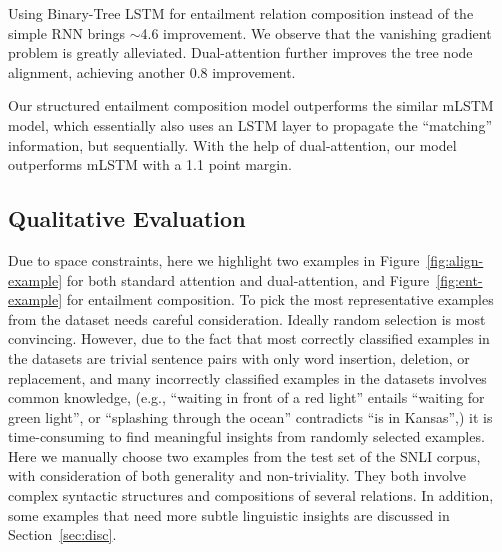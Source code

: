 Using Binary-Tree LSTM for entailment relation composition
instead of the simple RNN brings $\sim$4.6 improvement. 
We observe that the vanishing gradient problem is greatly
alleviated.
Dual-attention further improves the tree
node alignment, achieving another 0.8 improvement.

Our structured entailment composition model outperforms
the similar mLSTM model, which essentially
also uses an LSTM layer to propagate 
the ``matching'' information, but sequentially. %
With the help of dual-attention, our model outperforms
mLSTM with a 1.1 point margin.

 

\subsection{Qualitative Evaluation}
\label{sec:qual-eval}


Due to space constraints, 
here we highlight two examples in Figure~\ref{fig:align-example} for both standard attention and dual-attention,
and Figure~\ref{fig:ent-example} for entailment composition.
To pick the most representative examples from the dataset needs
careful consideration.
Ideally random selection is most convincing. However,
due to the fact that most correctly classified examples 
in the datasets
are trivial sentence pairs with only word insertion, deletion, or replacement,
and many incorrectly classified examples in the datasets 
involves common knowledge, (e.g., ``waiting in front of a red light''
entails ``waiting for green light'',
or ``splashing through the ocean'' contradicts ``is in Kansas'',)
it is time-consuming to find meaningful insights
from randomly selected examples.
Here we manually choose two examples from the test set 
of the SNLI corpus,
with consideration of both generality 
and non-triviality. They both involve complex syntactic structures and
compositions of several relations. 
In addition, some examples that need more subtle linguistic insights 
are discussed in Section~\ref{sec:disc}.




